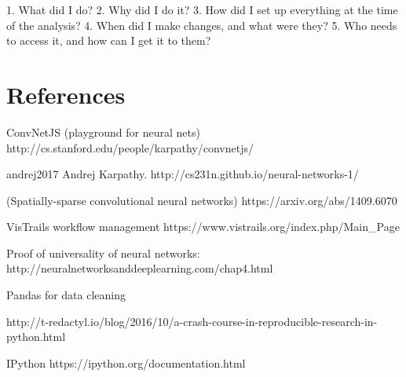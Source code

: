 \documentclass[12pt,letterpaper,boxed]{article}
\begin{document}
1. What did I do?
2. Why did I do it?
3. How did I set up everything at the time of the analysis?
4. When did I make changes, and what were they?
5. Who needs to access it, and how can I get it to them?

\section{References}
ConvNetJS (playground for neural nets)
http://cs.stanford.edu/people/karpathy/convnetjs/

andrej2017
Andrej Karpathy. http://cs231n.github.io/neural-networks-1/

(Spatially-sparse convolutional neural networks) https://arxiv.org/abs/1409.6070

VisTrails workflow management
https://www.vistrails.org/index.php/Main_Page

Proof of universality of neural networks:
http://neuralnetworksanddeeplearning.com/chap4.html


Pandas for data cleaning

http://t-redactyl.io/blog/2016/10/a-crash-course-in-reproducible-research-in-python.html

IPython
https://ipython.org/documentation.html
\end{document}
